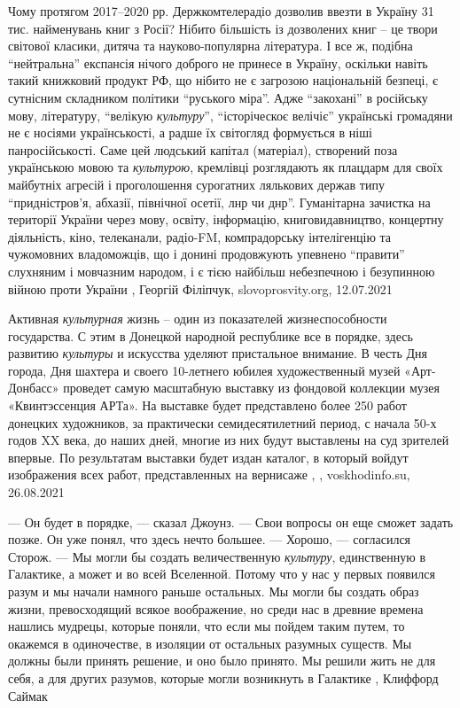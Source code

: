 Чому протягом 2017–2020 рр. Держкомтелерадіо дозволив ввезти в Україну 31 тис.
найменувань книг з Росії? Нібито більшість із дозволених книг – це твори
світової класики, дитяча та науково-популярна література. І все ж, подібна
\enquote{нейтральна} експансія нічого доброго не принесе в Україну, оскільки навіть
такий книжковий продукт РФ, що нібито не є загрозою національній безпеці, є
сутнісним складником політики \enquote{руського міра}. Адже \enquote{закохані} в російську
мову, літературу, \enquote{велікую \emph{культуру}}, \enquote{історіческоє велічіє} українські
громадяни не є носіями українськості, а радше їх світогляд формується в ніші
панросійськості. Саме цей людський капітал (матеріал), створений поза
українською мовою та \emph{культурою}, кремлівці розглядають як плацдарм для своїх
майбутніх агресій і проголошення сурогатних лялькових держав типу
\enquote{придністров’я, абхазії, північної осетії, лнр чи днр}. Гуманітарна зачистка на
території України через мову, освіту, інформацію, книговидавництво, концертну
діяльність, кіно, телеканали, радіо-FM, компрадорську інтелігенцію та
чужомовних владоможців, що і донині продовжують упевнено \enquote{правити} слухняним і
мовчазним народом, і є тією найбільш небезпечною і безупинною війною проти
України
, Георгій Філіпчук, slovoprosvity.org, 12.07.2021

Активная \emph{культурная} жизнь – один из показателей жизнеспособности
государства. С этим в Донецкой народной республике все в порядке, здесь
развитию \emph{культуры} и искусства уделяют пристальное внимание.  В честь Дня
города, Дня шахтера и своего 10-летнего юбилея художественный музей
«Арт-Донбасс» проведет самую масштабную выставку из фондовой коллекции музея
«Квинтэссенция АРТа».  На выставке будет представлено более 250 работ донецких
художников, за практически семидесятилетний период, с начала 50-х годов XX
века, до наших дней, многие из них будут выставлены на суд зрителей впервые. По
результатам выставки будет издан каталог, в который войдут изображения всех
работ, представленных на вернисаже
, , voskhodinfo.su, 26.08.2021

— Он будет в порядке, — сказал Джоунз. — Свои вопросы он еще сможет задать
позже. Он уже понял, что здесь нечто большее.  — Хорошо, — согласился Сторож. —
Мы могли бы создать величественную \emph{культуру}, единственную в Галактике, а может
и во всей Вселенной. Потому что у нас у первых появился разум и мы начали
намного раньше остальных. Мы могли бы создать образ жизни, превосходящий всякое
воображение, но среди нас в древние времена нашлись мудрецы, которые поняли,
что если мы пойдем таким путем, то окажемся в одиночестве, в изоляции от
остальных разумных существ. Мы должны были принять решение, и оно было принято.
Мы решили жить не для себя, а для других разумов, которые могли возникнуть в
Галактике
, Клиффорд Саймак

